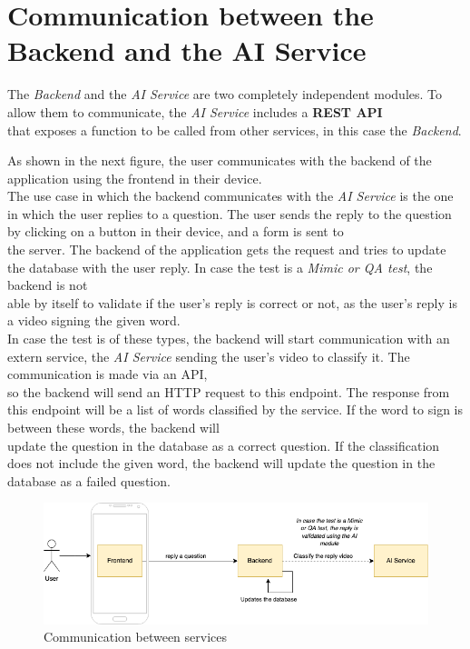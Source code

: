\newpage
\section{Communication between the Backend and the AI Service}
    The \textit{Backend} and the \textit{AI Service} are two completely independent modules. To allow them to communicate, the \textit{AI Service} includes a \textbf{REST API} \\
    that exposes a function to be called from other services, in this case the \textit{Backend}. 

    As shown in the next figure, the user communicates with the backend of the application using the frontend in their device. \\
    
    The use case in which the backend communicates with the \textit{AI Service} is the one in which the user replies to a question. The user sends the reply to the question by clicking on a button in their device, and a form is sent to \\
    the server. The backend of the application gets the request and tries to update the database with the user reply. In case the test is a \textit{Mimic or QA test}, the backend is not \\
    able by itself to validate if the user's reply is correct or not, as the user's reply is a video signing the given word. \\

    In case the test is of these types, the backend will start communication with an extern service, the \textit{AI Service} sending the user's video to classify it. The communication is made via an API, \\
    so the backend will send an HTTP request to this endpoint. The response from this endpoint will be a list of words classified by the service. If the word to sign is between these words, the backend will \\
    update the question in the database as a correct question. If the classification does not include the given word, the backend will update the question in the database as a failed question.
    \begin{figure}[H]
        \centering
            \includegraphics[width=\textwidth]{assets/diagrams/comm.png}
        \caption{Communication between services}
        \label{fig:impl_comm}
    \end{figure}

